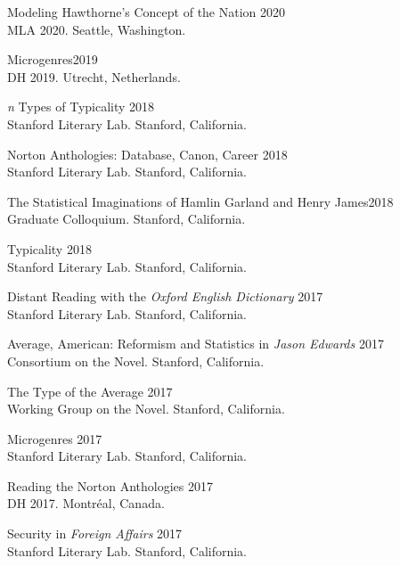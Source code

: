 \documentclass[
  12pt,
  letterpaper,
]{article}
\begin{document}
Modeling Hawthorne's Concept of the Nation \hfill 2020\\
\hspace*{0.333em} MLA 2020. Seattle, Washington.

Microgenres\hfill 2019\\
\hspace*{0.333em} DH 2019. Utrecht, Netherlands.

\emph{n} Types of Typicality \hfill 2018\\
\hspace*{0.333em} Stanford Literary Lab. Stanford, California.

Norton Anthologies: Database, Canon, Career \hfill 2018\\
\hspace*{0.333em} Stanford Literary Lab. Stanford, California.

The Statistical Imaginations of Hamlin Garland and Henry
James\hfill 2018\\
\hspace*{0.333em} Graduate Colloquium. Stanford, California.

Typicality \hfill 2018\\
\hspace*{0.333em} Stanford Literary Lab. Stanford, California.

Distant Reading with the \emph{Oxford English Dictionary} \hfill 2017\\
\hspace*{0.333em} Stanford Literary Lab. Stanford, California.

Average, American: Reformism and Statistics in \emph{Jason Edwards}
\hfill 2017\\
\hspace*{0.333em} Consortium on the Novel. Stanford, California.

The Type of the Average \hfill 2017\\
\hspace*{0.333em} Working Group on the Novel. Stanford, California.

Microgenres \hfill 2017\\
\hspace*{0.333em} Stanford Literary Lab. Stanford, California.

Reading the Norton Anthologies \hfill 2017\\
\hspace*{0.333em} DH 2017. Montréal, Canada.

Security in \emph{Foreign Affairs} \hfill 2017\\
\hspace*{0.333em} Stanford Literary Lab. Stanford, California.
\end{document}
